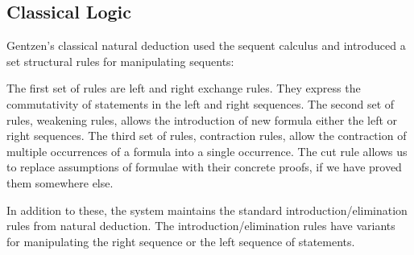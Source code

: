   \subsection{Classical Logic}
  
  Gentzen's classical natural deduction used the sequent calculus and introduced a set structural rules for manipulating sequents:
  
  
  The first set of rules are left and right exchange rules. 
  They express the commutativity of statements in the left and right sequences.
  The second set of rules, weakening rules, allows the introduction of new formula either the left or right sequences.
  The third set of rules, contraction rules, allow the contraction of multiple occurrences of a formula into a single occurrence. 
  The cut rule allows us to replace assumptions of formulae with their concrete proofs, if we have proved them somewhere else.
  
  In addition to these, the system maintains the standard introduction/elimination rules from natural deduction.
  The introduction/elimination rules have variants for manipulating the right sequence or the left sequence of statements.
  
